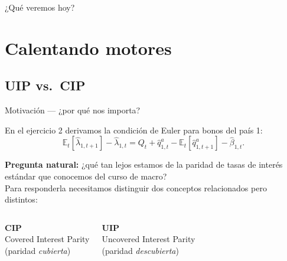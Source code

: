 {
  \begin{frame}[plain]
    \titlepage
  \end{frame}
}

{
  \begin{frame}{¿Qué veremos hoy?}
    \tableofcontents
  \end{frame}
}

\section{Calentando motores}

\subsection{UIP vs.\ CIP}

\begin{frame}{Motivación — ¿por qué nos importa?}

  En el ejercicio 2 derivamos la condición de Euler para bonos del país 1:
  \[
    \mathbb{E}_t[\hat{\lambda}_{1,t+1}] - \hat{\lambda}_{1,t}
    = Q_t + \hat{q}^a_{1,t} - \mathbb{E}_t[\hat{q}^a_{1,t+1}] - \hat{\beta}_{1,t}.
  \]

  \bigskip
  \textbf{Pregunta natural:} ¿qué tan lejos estamos de la paridad de tasas de interés
  estándar que conocemos del curso de macro? \\[0.5em]

  Para responderla necesitamos distinguir dos conceptos relacionados pero distintos:

  \bigskip
  \begin{columns}
    \centering
    \textcolor{peacockblue}{\textbf{CIP}} \\
    \small Covered Interest Parity \\
    \footnotesize (paridad \emph{cubierta})

    \centering
    \textcolor{spicy}{\textbf{UIP}} \\
    \small Uncovered Interest Parity \\
    \footnotesize (paridad \emph{descubierta})
  \end{columns}

\end{frame}

